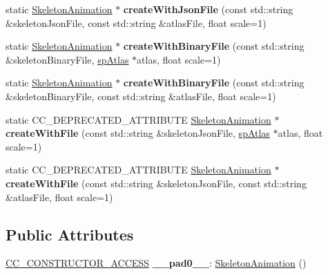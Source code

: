 \begin{DoxyCompactItemize}
static \hyperlink{classspine_1_1SkeletonAnimation}{Skeleton\+Animation} $\ast$ {\bfseries create\+With\+Json\+File} (const std\+::string \&skeleton\+Json\+File, const std\+::string \&atlas\+File, float scale=1)
\item 
\mbox{\label{classspine_1_1SkeletonAnimation_adef8278c33ca01995d56667b2bdb4975}} 
static \hyperlink{classspine_1_1SkeletonAnimation}{Skeleton\+Animation} $\ast$ {\bfseries create\+With\+Binary\+File} (const std\+::string \&skeleton\+Binary\+File, \hyperlink{structspAtlas}{sp\+Atlas} $\ast$atlas, float scale=1)
\item 
\mbox{\label{classspine_1_1SkeletonAnimation_a2b30d4810748075c0b9808ba717ce8bf}} 
static \hyperlink{classspine_1_1SkeletonAnimation}{Skeleton\+Animation} $\ast$ {\bfseries create\+With\+Binary\+File} (const std\+::string \&skeleton\+Binary\+File, const std\+::string \&atlas\+File, float scale=1)
\item 
\mbox{\label{classspine_1_1SkeletonAnimation_aaab70b6f4e014fd3141bd946aa3113ef}} 
static C\+C\+\_\+\+D\+E\+P\+R\+E\+C\+A\+T\+E\+D\+\_\+\+A\+T\+T\+R\+I\+B\+U\+TE \hyperlink{classspine_1_1SkeletonAnimation}{Skeleton\+Animation} $\ast$ {\bfseries create\+With\+File} (const std\+::string \&skeleton\+Json\+File, \hyperlink{structspAtlas}{sp\+Atlas} $\ast$atlas, float scale=1)
\item 
\mbox{\label{classspine_1_1SkeletonAnimation_aad2cb63fa5dd62ae0ed1de95cae3643b}} 
static C\+C\+\_\+\+D\+E\+P\+R\+E\+C\+A\+T\+E\+D\+\_\+\+A\+T\+T\+R\+I\+B\+U\+TE \hyperlink{classspine_1_1SkeletonAnimation}{Skeleton\+Animation} $\ast$ {\bfseries create\+With\+File} (const std\+::string \&skeleton\+Json\+File, const std\+::string \&atlas\+File, float scale=1)
\end{DoxyCompactItemize}
\subsection*{Public Attributes}
\begin{DoxyCompactItemize}
\item 
\mbox{\label{classspine_1_1SkeletonAnimation_ac601b42f8cbaf934c01d2b196d7e96d3}} 
\hyperlink{_2cocos2d_2cocos_2base_2ccConfig_8h_a25ef1314f97c35a2ed3d029b0ead6da0}{C\+C\+\_\+\+C\+O\+N\+S\+T\+R\+U\+C\+T\+O\+R\+\_\+\+A\+C\+C\+E\+SS} {\bfseries \+\_\+\+\_\+pad0\+\_\+\+\_\+}\+: \hyperlink{classspine_1_1SkeletonAnimation}{Skeleton\+Animation} ()
\end{DoxyCompactItemize}
